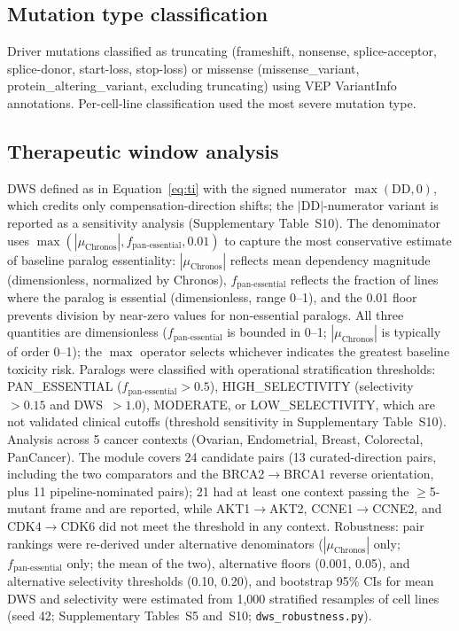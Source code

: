 \documentclass[11pt,a4paper]{article}
\begin{document}
\subsection*{Mutation type classification}

Driver mutations classified as truncating (frameshift, nonsense, splice-acceptor, splice-donor, start-loss, stop-loss) or missense (missense\_variant, protein\_altering\_variant, excluding truncating) using VEP VariantInfo annotations. Per-cell-line classification used the most severe mutation type.

\subsection*{Therapeutic window analysis}

DWS defined as in Equation~\ref{eq:ti} with the signed numerator $\max(\mathrm{DD},0)$, which credits only compensation-direction shifts; the $|$DD$|$-numerator variant is reported as a sensitivity analysis (Supplementary Table~S10). The denominator uses $\max(|\mu_{\text{Chronos}}|, f_{\text{pan-essential}}, 0.01)$ to capture the most conservative estimate of baseline paralog essentiality: $|\mu_{\text{Chronos}}|$ reflects mean dependency magnitude (dimensionless, normalized by Chronos), $f_{\text{pan-essential}}$ reflects the fraction of lines where the paralog is essential (dimensionless, range 0--1), and the 0.01 floor prevents division by near-zero values for non-essential paralogs. All three quantities are dimensionless ($f_{\text{pan-essential}}$ is bounded in 0--1; $|\mu_{\text{Chronos}}|$ is typically of order 0--1); the $\max$ operator selects whichever indicates the greatest baseline toxicity risk. Paralogs were classified with operational stratification thresholds: PAN\_ESSENTIAL ($f_{\text{pan-essential}}>0.5$), HIGH\_SELECTIVITY (selectivity~$>0.15$ and DWS~$>1.0$), MODERATE, or LOW\_SELECTIVITY, which are not validated clinical cutoffs (threshold sensitivity in Supplementary Table~S10). Analysis across 5 cancer contexts (Ovarian, Endometrial, Breast, Colorectal, PanCancer). The module covers 24 candidate pairs (13 curated-direction pairs, including the two comparators and the BRCA2$\rightarrow$BRCA1 reverse orientation, plus 11 pipeline-nominated pairs); 21 had at least one context passing the $\ge$5-mutant frame and are reported, while AKT1$\rightarrow$AKT2, CCNE1$\rightarrow$CCNE2, and CDK4$\rightarrow$CDK6 did not meet the threshold in any context. Robustness: pair rankings were re-derived under alternative denominators ($|\mu_{\text{Chronos}}|$ only; $f_{\text{pan-essential}}$ only; the mean of the two), alternative floors (0.001, 0.05), and alternative selectivity thresholds (0.10, 0.20), and bootstrap 95\% CIs for mean DWS and selectivity were estimated from 1{,}000 stratified resamples of cell lines (seed 42; Supplementary Tables~S5 and~S10; \texttt{dws\_robustness.py}).
\end{document}
